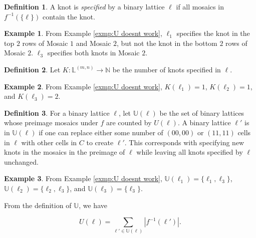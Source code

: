 \documentclass[12pt]{article}
\theoremstyle{plain}
\theoremstyle{definition}
\newtheorem{definition}{Definition}[section]
\theoremstyle{remark}
\theoremstyle{definition}
\newtheorem{exmp}{Example}[section]
\begin{document}
\begin{definition}
    A knot is \textit{specified} by a binary lattice $\ell$ if all mosaics in $f^{-1}(\{\ell\})$ contain the knot.
\end{definition}

\begin{exmp}
    From Example \ref{exmp:U doesnt work}, $\ell_1$ specifies the knot in the top $2$ rows of Mosaic $1$ and Mosaic $2$, but not the knot in the bottom $2$ rows of Mosaic $2$. $\ell_3$ specifies both knots in Mosaic $2$.
\label{exmp:specifying example}
\end{exmp}

\begin{definition}
    Let $K: \mathbb{L}^{(m,n)} \to \mathbb{N}$ be the number of knots specified in $\ell$.
\end{definition}

\begin{exmp}
    From Example \ref{exmp:U doesnt work}, $K(\ell_1) =1$, $K(\ell_2) =1$,  and $K(\ell_3) =2$.

\label{exmp:counting knots}
\end{exmp}

\begin{definition}
For a binary lattice $\ell$, let $\mathbb{U}(\ell)$ be the set of binary lattices whose preimage mosaics under $f$ are counted by $U(\ell)$. A binary lattice $\ell'$ is in $\mathbb{U}(\ell)$ if one can replace either some number of $(00,00)$ or $(11,11)$ cells in $\ell$ with other cells in $C$ to create $\ell'$. This corresponds with specifying new knots in the mosaics in the preimage of $\ell$ while leaving all knots specified by $\ell$ unchanged. 
\end{definition}

\begin{exmp}
From Example \ref{exmp:U doesnt work}, $\mathbb{U}(\ell_1) = \{\ell_1, \ell_3\}$, $\mathbb{U}(\ell_2) = \{\ell_2, \ell_3\}$, and $\mathbb{U}(\ell_3) = \{\ell_3\}$.


\label{exmp:four two mosaics}
\end{exmp}

From the definition of $\mathbb{U}$, we have

\begin{equation}
    U(\ell) = \sum_{\ell' \in \mathbb{U}(\ell)}|f^{-1}(\ell')|.
    \label{eq:U identity}
\end{equation}
\end{document}
